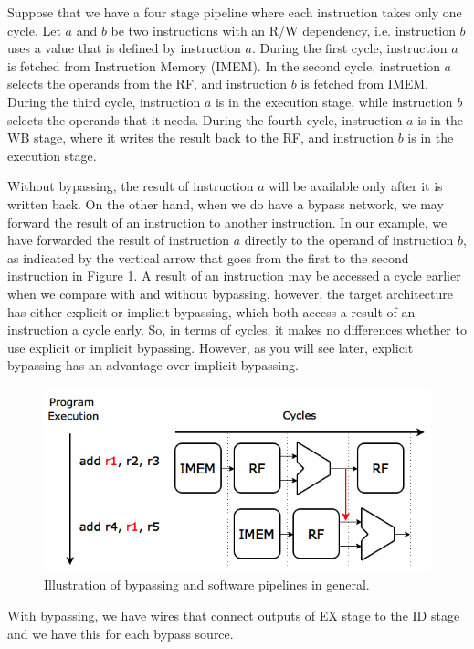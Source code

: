 Suppose that we have a four stage pipeline where each instruction takes only one cycle. Let $a$ and $b$ be two instructions with an R/W dependency, i.e. instruction $b$ uses a value that is defined by instruction $a$. During the first cycle, instruction $a$ is fetched from Instruction Memory (IMEM). In the second cycle, instruction $a$ selects the operands from the RF, and instruction $b$ is fetched from IMEM. During the third cycle, instruction $a$ is in the execution stage, while instruction $b$ selects the operands that it needs. During the fourth cycle, instruction $a$ is in the WB stage, where it writes the result back to the RF, and instruction $b$ is in the execution stage.

Without bypassing, the result of instruction $a$ will be available only after it is written back. On the other hand, when we do have a bypass network, we may forward the result of an instruction to another instruction. In our example, we have forwarded the result of instruction $a$ directly to the operand of instruction $b$, as indicated by the vertical arrow that goes from the first to the second instruction in Figure \ref{fig:bypass_principle}. A result of an instruction may be accessed a cycle earlier when we compare with and without bypassing, however, the target architecture has either explicit or implicit bypassing, which both access a result of an instruction a cycle early. So, in terms of cycles, it makes no differences whether to use explicit or implicit bypassing. However, as you will see later, explicit bypassing has an advantage over implicit bypassing.

\begin{figure}[H]
\centering
\includegraphics[width=.6\textwidth]{figures/bypassing_principle/05_bypassing_principle}
\caption{Illustration of bypassing and software pipelines in general.}
\label{fig:bypass_principle}
\end{figure}

With bypassing, we have wires that connect outputs of EX stage to the ID stage and we have this for each bypass source. 


